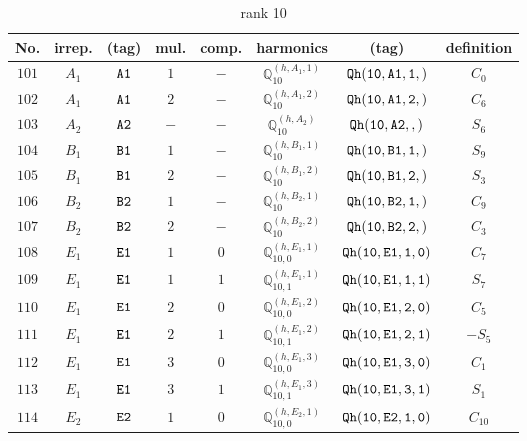 \documentclass[fleqn,8pt]{jsarticle}
\begin{document}
\begin{table}[ht!]
\begin{center}
\caption{rank 10}
\renewcommand{\arraystretch}{1.3}
\begin{tabular}{cccccccc} \hline \hline
No. & irrep. & (tag) & mul. & comp. & harmonics & (tag) & definition \\ \hline
$ 101 $ & $ A_{1} $ & $ {\tt A1} $ & $ 1 $ & $ - $ & $ \mathbb{Q}_{10}^{(h,A_{1},1)} $ & $ {\tt Qh(10,A1,1,)} $ & $ C_{0} $ \\
$ 102 $ & $ A_{1} $ & $ {\tt A1} $ & $ 2 $ & $ - $ & $ \mathbb{Q}_{10}^{(h,A_{1},2)} $ & $ {\tt Qh(10,A1,2,)} $ & $ C_{6} $ \\
$ 103 $ & $ A_{2} $ & $ {\tt A2} $ & $ - $ & $ - $ & $ \mathbb{Q}_{10}^{(h,A_{2})} $ & $ {\tt Qh(10,A2,,)} $ & $ S_{6} $ \\
$ 104 $ & $ B_{1} $ & $ {\tt B1} $ & $ 1 $ & $ - $ & $ \mathbb{Q}_{10}^{(h,B_{1},1)} $ & $ {\tt Qh(10,B1,1,)} $ & $ S_{9} $ \\
$ 105 $ & $ B_{1} $ & $ {\tt B1} $ & $ 2 $ & $ - $ & $ \mathbb{Q}_{10}^{(h,B_{1},2)} $ & $ {\tt Qh(10,B1,2,)} $ & $ S_{3} $ \\
$ 106 $ & $ B_{2} $ & $ {\tt B2} $ & $ 1 $ & $ - $ & $ \mathbb{Q}_{10}^{(h,B_{2},1)} $ & $ {\tt Qh(10,B2,1,)} $ & $ C_{9} $ \\
$ 107 $ & $ B_{2} $ & $ {\tt B2} $ & $ 2 $ & $ - $ & $ \mathbb{Q}_{10}^{(h,B_{2},2)} $ & $ {\tt Qh(10,B2,2,)} $ & $ C_{3} $ \\
$ 108 $ & $ E_{1} $ & $ {\tt E1} $ & $ 1 $ & $ 0 $ & $ \mathbb{Q}_{10,0}^{(h,E_{1},1)} $ & $ {\tt Qh(10,E1,1,0)} $ & $ C_{7} $ \\
$ 109 $ & $ E_{1} $ & $ {\tt E1} $ & $ 1 $ & $ 1 $ & $ \mathbb{Q}_{10,1}^{(h,E_{1},1)} $ & $ {\tt Qh(10,E1,1,1)} $ & $ S_{7} $ \\
$ 110 $ & $ E_{1} $ & $ {\tt E1} $ & $ 2 $ & $ 0 $ & $ \mathbb{Q}_{10,0}^{(h,E_{1},2)} $ & $ {\tt Qh(10,E1,2,0)} $ & $ C_{5} $ \\
$ 111 $ & $ E_{1} $ & $ {\tt E1} $ & $ 2 $ & $ 1 $ & $ \mathbb{Q}_{10,1}^{(h,E_{1},2)} $ & $ {\tt Qh(10,E1,2,1)} $ & $ - S_{5} $ \\
$ 112 $ & $ E_{1} $ & $ {\tt E1} $ & $ 3 $ & $ 0 $ & $ \mathbb{Q}_{10,0}^{(h,E_{1},3)} $ & $ {\tt Qh(10,E1,3,0)} $ & $ C_{1} $ \\
$ 113 $ & $ E_{1} $ & $ {\tt E1} $ & $ 3 $ & $ 1 $ & $ \mathbb{Q}_{10,1}^{(h,E_{1},3)} $ & $ {\tt Qh(10,E1,3,1)} $ & $ S_{1} $ \\
$ 114 $ & $ E_{2} $ & $ {\tt E2} $ & $ 1 $ & $ 0 $ & $ \mathbb{Q}_{10,0}^{(h,E_{2},1)} $ & $ {\tt Qh(10,E2,1,0)} $ & $ C_{10} $ \\

\end{tabular}
\end{center}
\end{table}
\end{document}
